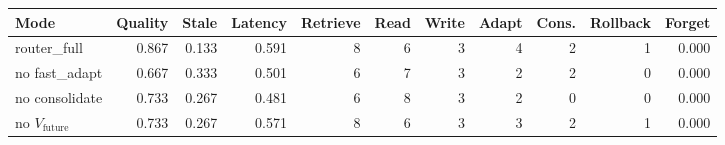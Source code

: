\begin{tabular}{lrrrrrrrrrr}
\toprule
Mode & Quality & Stale & Latency & Retrieve & Read & Write & Adapt & Cons. & Rollback & Forget \\
\midrule
router\_full & 0.867 & 0.133 & 0.591 & 8 & 6 & 3 & 4 & 2 & 1 & 0.000 \\
no fast\_adapt & 0.667 & 0.333 & 0.501 & 6 & 7 & 3 & 2 & 2 & 0 & 0.000 \\
no consolidate & 0.733 & 0.267 & 0.481 & 6 & 8 & 3 & 2 & 0 & 0 & 0.000 \\
no $V_{\text{future}}$ & 0.733 & 0.267 & 0.571 & 8 & 6 & 3 & 3 & 2 & 1 & 0.000 \\
\bottomrule
\end{tabular}

